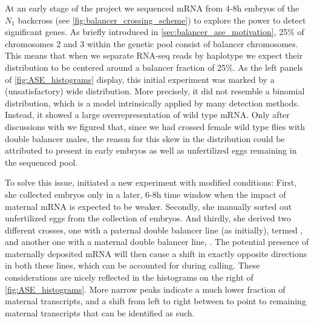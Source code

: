 
At an early stage of the project we sequenced mRNA from 4-8h embryos of the
$N_1$ backcross (see \cref{fig:balancer_crossing_scheme}) to explore the power to
detect significant \ase genes. As briefly introduced in
\cref{sec:balancer_ase_motivation}, 25\% of chromosomes 2 and 3 within the
genetic pool consist of balancer chromosomes. This means that when we separate
RNA-seq reads by haplotype we expect their distribution to be centered around a
balancer fraction of 25\%. As the left panels of \cref{fig:ASE_histograms}
display, this initial experiment was marked by a (unsatisfactory) wide
distribution. More precisely, it did not resemble a binomial distribution, which
is a model intrinsically applied by many \ase detection methods. Instead, it showed a large
overrepresentation of wild type mRNA. Only after discussions with
\garfield we figured that, since we had crossed female wild type flies with double
balancer males, the reason for this skew in the distribution could be attributed
to 
present in early embryos as well as unfertilized eggs remaining in the sequenced
pool.

To solve this issue, \yad initiated a new experiment with modified conditions: First, she
collected embryos only in a later, 6-8h time window when the impact of maternal
mRNA is expected to be weaker. Secondly, she manually sorted out unfertilized eggs
from the collection of embryos. And thirdly, she derived two different crosses,
one with a paternal double balancer line (as initially), termed \Npat,
and another one with a maternal double balancer line, \Nmat. The potential
presence of maternally deposited mRNA will then cause a shift in exactly opposite
directions in both these lines, which can be accounted for during \ase
calling. These considerations are nicely reflected in the histograms on the
right of \cref{fig:ASE_histograms}. More narrow peaks indicate a much lower
fraction of maternal transcripts, and a shift from left to right between \Npat
to \Nmat point to remaining maternal transcripts that can be identified as such.






